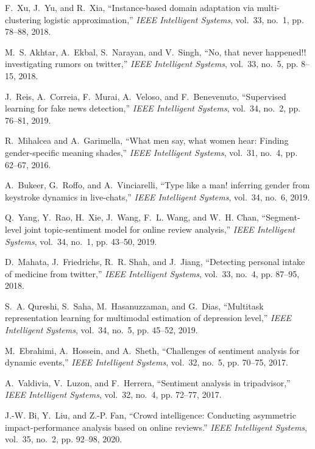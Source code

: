 \documentclass[journal]{IEEEtran}
\begin{document}
\begin{thebibliography}{10}
F.~Xu, J.~Yu, and R.~Xia, ``Instance-based domain adaptation via
  multi-clustering logistic approximation,'' \emph{IEEE Intelligent Systems},
  vol.~33, no.~1, pp. 78--88, 2018.

M.~S. Akhtar, A.~Ekbal, S.~Narayan, and V.~Singh, ``No, that never happened!!
  investigating rumors on twitter,'' \emph{IEEE Intelligent Systems}, vol.~33,
  no.~5, pp. 8--15, 2018.

J.~Reis, A.~Correia, F.~Murai, A.~Veloso, and F.~Benevenuto, ``Supervised
  learning for fake news detection,'' \emph{IEEE Intelligent Systems}, vol.~34,
  no.~2, pp. 76--81, 2019.

R.~Mihalcea and A.~Garimella, ``What men say, what women hear: Finding
  gender-specific meaning shades,'' \emph{IEEE Intelligent Systems}, vol.~31,
  no.~4, pp. 62--67, 2016.

A.~Bukeer, G.~Roffo, and A.~Vinciarelli, ``Type like a man! inferring gender
  from keystroke dynamics in live-chats,'' \emph{IEEE Intelligent Systems},
  vol.~34, no.~6, 2019.

Q.~Yang, Y.~Rao, H.~Xie, J.~Wang, F.~L. Wang, and W.~H. Chan, ``Segment-level
  joint topic-sentiment model for online review analysis,'' \emph{IEEE
  Intelligent Systems}, vol.~34, no.~1, pp. 43--50, 2019.

D.~Mahata, J.~Friedrichs, R.~R. Shah, and J.~Jiang, ``Detecting personal intake
  of medicine from twitter,'' \emph{IEEE Intelligent Systems}, vol.~33, no.~4,
  pp. 87--95, 2018.

S.~A. Qureshi, S.~Saha, M.~Hasanuzzaman, and G.~Dias, ``Multitask
  representation learning for multimodal estimation of depression level,''
  \emph{IEEE Intelligent Systems}, vol.~34, no.~5, pp. 45--52, 2019.

M.~Ebrahimi, A.~Hossein, and A.~Sheth, ``Challenges of sentiment analysis for
  dynamic events,'' \emph{IEEE Intelligent Systems}, vol.~32, no.~5, pp.
  70--75, 2017.

A.~Valdivia, V.~Luzon, and F.~Herrera, ``Sentiment analysis in tripadvisor,''
  \emph{IEEE Intelligent Systems}, vol.~32, no.~4, pp. 72--77, 2017.

J.-W. Bi, Y.~Liu, and Z.-P. Fan, ``Crowd intelligence: Conducting asymmetric
  impact-performance analysis based on online reviews.'' \emph{{IEEE}
  Intelligent Systems}, vol.~35, no.~2, pp. 92--98, 2020.


\end{thebibliography}
\end{document}

